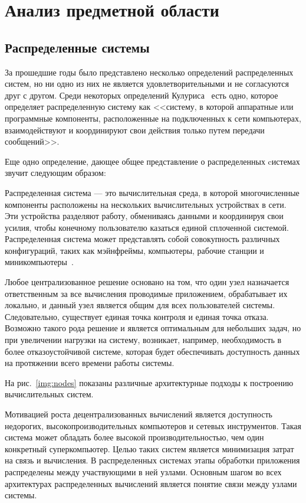 \section{Анализ предметной области}

\subsection{Распределенные системы}

За прошедшие годы было представлено несколько определений распределенных систем, но ни одно из них не является удовлетворительными и не согласуются друг с другом. 
Среди некоторых определений Кулуриса~\cite{2009distributed} есть одно, которое определяет распределенную систему как <<систему, в которой аппаратные или программные компоненты, расположенные на подключенных к сети компьютерах, взаимодействуют и координируют свои действия только путем передачи сообщений>>.

Еще одно определение, дающее общее представление о распределенных cистемах звучит следующим образом:

Распределенная система --- это вычислительная среда, в которой многочисленные компоненты расположены на нескольких вычислительных устройствах в сети. 
Эти устройства разделяют работу, обмениваясь данными и координируя свои усилия, чтобы конечному пользователю казаться единой сплоченной системой. 
Распределенная система может представлять собой совокупность различных конфигураций, таких как мэйнфреймы, компьютеры, рабочие станции и миникомпьютеры~\cite{khole2023compendium}.

Любое централизованное решение основано на том, что один узел назначается ответственным за все вычисления проводимые приложением, обрабатывает их локально, и данный узел является общим для всех пользователей системы.
Следовательно, существует единая точка контроля и единая точка отказа. 
Возможно такого рода решение и является оптимальным для небольших задач, но при увеличении нагрузки на систему, возникает, например, необходимость в более отказоустойчивой системе, которая будет обеспечивать доступность данных на протяжении всего времени работы системы.

На рис.~\ref{img:nodes} показаны различные архитектурные подходы к построению вычислительных систем.


Мотивацией роста децентрализованных вычислений является доступность недорогих, высокопроизводительных компьютеров и сетевых инструментов. 
Такая система может обладать более высокой производительностью, чем один конкретный суперкомпьютер. 
Целью таких систем является минимизация затрат на связь и вычисления. 
В распределенных системах этапы обработки приложения распределены между участвующими в ней узлами. 
Основным шагом во всех архитектурах распределенных вычислений является понятие связи между узлами системы.

